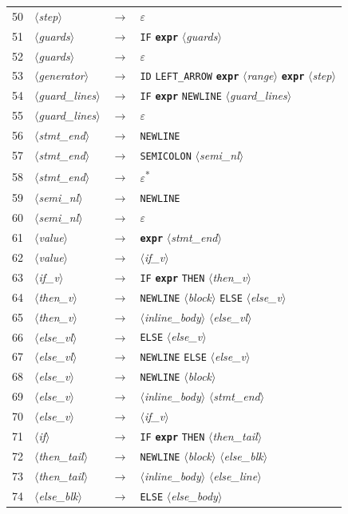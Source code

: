 \documentclass[a4paper,11pt]{article}
\newcommand{\nt}[1]{$\langle$\textit{#1}$\rangle$}   %
\newcommand{\tk}[1]{\texttt{#1}}                     %
\newcommand{\pt}[1]{\texttt{\textbf{#1}}}            %
\begin{document}
\begin{longtable}{r l c l}
50 & \nt{step} & $\rightarrow$ & $\varepsilon$ \\
51 & \nt{guards} & $\rightarrow$ & \tk{IF} \pt{expr} \nt{guards} \\
52 & \nt{guards} & $\rightarrow$ & $\varepsilon$ \\
53 & \nt{generator} & $\rightarrow$ & \tk{ID} \tk{LEFT\_ARROW} \pt{expr} \nt{range} \pt{expr} \nt{step} \\
54 & \nt{guard\_lines} & $\rightarrow$ & \tk{IF} \pt{expr} \tk{NEWLINE} \nt{guard\_lines} \\
55 & \nt{guard\_lines} & $\rightarrow$ & $\varepsilon$ \\
56 & \nt{stmt\_end} & $\rightarrow$ & \tk{NEWLINE} \\
57 & \nt{stmt\_end} & $\rightarrow$ & \tk{SEMICOLON} \nt{semi\_nl} \\
58 & \nt{stmt\_end} & $\rightarrow$ & $\varepsilon$\textsuperscript{*} \\
59 & \nt{semi\_nl} & $\rightarrow$ & \tk{NEWLINE} \\
60 & \nt{semi\_nl} & $\rightarrow$ & $\varepsilon$ \\
61 & \nt{value} & $\rightarrow$ & \pt{expr} \nt{stmt\_end} \\
62 & \nt{value} & $\rightarrow$ & \nt{if\_v} \\
63 & \nt{if\_v} & $\rightarrow$ & \tk{IF} \pt{expr} \tk{THEN} \nt{then\_v} \\
64 & \nt{then\_v} & $\rightarrow$ & \tk{NEWLINE} \nt{block} \tk{ELSE} \nt{else\_v} \\
65 & \nt{then\_v} & $\rightarrow$ & \nt{inline\_body} \nt{else\_vl} \\
66 & \nt{else\_vl} & $\rightarrow$ & \tk{ELSE} \nt{else\_v} \\
67 & \nt{else\_vl} & $\rightarrow$ & \tk{NEWLINE} \tk{ELSE} \nt{else\_v} \\
68 & \nt{else\_v} & $\rightarrow$ & \tk{NEWLINE} \nt{block} \\
69 & \nt{else\_v} & $\rightarrow$ & \nt{inline\_body} \nt{stmt\_end} \\
70 & \nt{else\_v} & $\rightarrow$ & \nt{if\_v} \\
71 & \nt{if} & $\rightarrow$ & \tk{IF} \pt{expr} \tk{THEN} \nt{then\_tail} \\
72 & \nt{then\_tail} & $\rightarrow$ & \tk{NEWLINE} \nt{block} \nt{else\_blk} \\
73 & \nt{then\_tail} & $\rightarrow$ & \nt{inline\_body} \nt{else\_line} \\
74 & \nt{else\_blk} & $\rightarrow$ & \tk{ELSE} \nt{else\_body} \\

\end{longtable}
\end{document}
